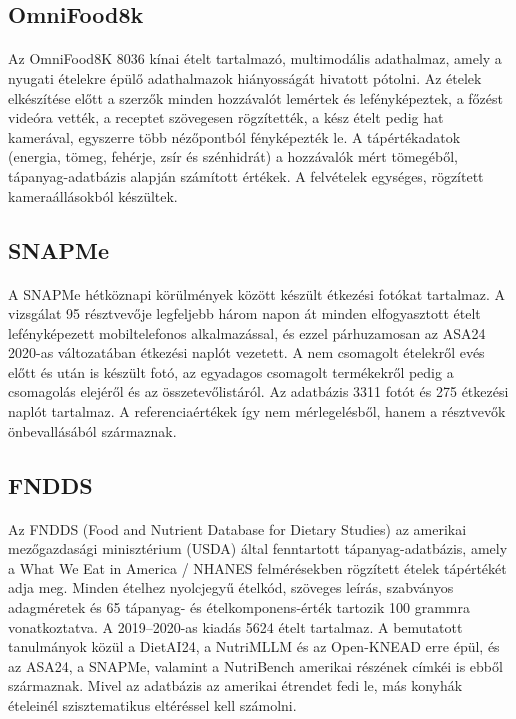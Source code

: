 \subsection{OmniFood8k}
\paragraph{}Az OmniFood8K \cite{yu2026omnifood8k} 8036 kínai ételt tartalmazó, multimodális adathalmaz, amely a nyugati ételekre épülő adathalmazok hiányosságát hivatott pótolni. Az ételek elkészítése előtt a szerzők minden hozzávalót lemértek és lefényképeztek, a főzést videóra vették, a receptet szövegesen rögzítették, a kész ételt pedig hat kamerával, egyszerre több nézőpontból fényképezték le. A tápértékadatok (energia, tömeg, fehérje, zsír és szénhidrát) a hozzávalók mért tömegéből, tápanyag-adatbázis alapján számított értékek. A felvételek egységes, rögzített kameraállásokból készültek.

\subsection{SNAPMe}
\paragraph{}A SNAPMe \cite{larke2023snapme} hétköznapi körülmények között készült étkezési fotókat tartalmaz. A vizsgálat 95 résztvevője legfeljebb három napon át minden elfogyasztott ételt lefényképezett mobiltelefonos alkalmazással, és ezzel párhuzamosan az ASA24 2020-as változatában étkezési naplót vezetett. A nem csomagolt ételekről evés előtt és után is készült fotó, az egyadagos csomagolt termékekről pedig a csomagolás elejéről és az összetevőlistáról. Az adatbázis 3311 fotót és 275 étkezési naplót tartalmaz. A referenciaértékek így nem mérlegelésből, hanem a résztvevők önbevallásából származnak.

\subsection{FNDDS}
\paragraph{}Az FNDDS (Food and Nutrient Database for Dietary Studies) \cite{usda_fndds_2022} az amerikai mezőgazdasági minisztérium (USDA) által fenntartott tápanyag-adatbázis, amely a What We Eat in America / NHANES felmérésekben rögzített ételek tápértékét adja meg. Minden ételhez nyolcjegyű ételkód, szöveges leírás, szabványos adagméretek és 65 tápanyag- és ételkomponens-érték tartozik 100 grammra vonatkoztatva. A 2019--2020-as kiadás 5624 ételt tartalmaz. A bemutatott tanulmányok közül a DietAI24, a NutriMLLM és az Open-KNEAD erre épül, és az ASA24, a SNAPMe, valamint a NutriBench amerikai részének címkéi is ebből származnak. Mivel az adatbázis az amerikai étrendet fedi le, más konyhák ételeinél szisztematikus eltéréssel kell számolni.

\clearpage %
